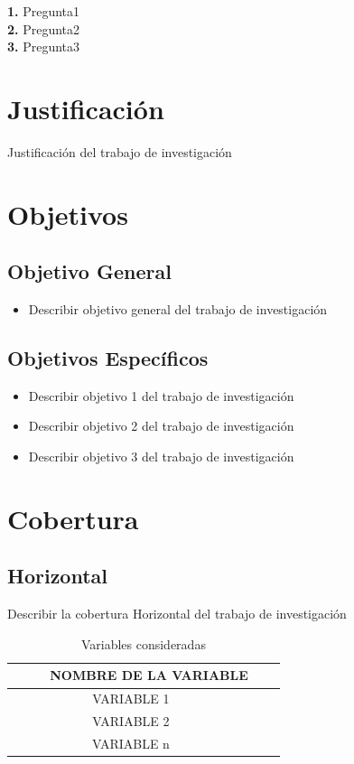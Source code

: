 \documentclass[oneside,11pt]{Latex/Classes/PhDthesisPSnPDF}
\begin{document}
\textbf{1.} Pregunta1\\

\textbf{2.} Pregunta2\\

\textbf{3.} Pregunta3\\

\section{Justificación}

Justificación del trabajo de investigación\\

\section{Objetivos}

\subsection{Objetivo General}
\begin{itemize}
  \item{Describir objetivo general del trabajo de investigación}
\end{itemize}

\subsection{Objetivos Específicos}
\begin{itemize}
  \item{Describir objetivo 1 del trabajo de investigación}
  \item{Describir objetivo 2 del trabajo de investigación}
  \item{Describir objetivo 3 del trabajo de investigación}
\end{itemize}

\section{Cobertura}

\subsection{Horizontal}

Describir la cobertura Horizontal del trabajo de investigación\\

\begin{table}[ht]
\centering
\caption{Variables consideradas} 
\resizebox{10cm}{!} {
\begin{tabular}{ccc}
  \hline
\ \ \ \ \ NOMBRE DE LA VARIABLE \\ 
  \hline
   VARIABLE 1 \\ 
VARIABLE 2\\ 
VARIABLE n\\ 
   \hline
\end{tabular}
}
\end{table}
\end{document}
